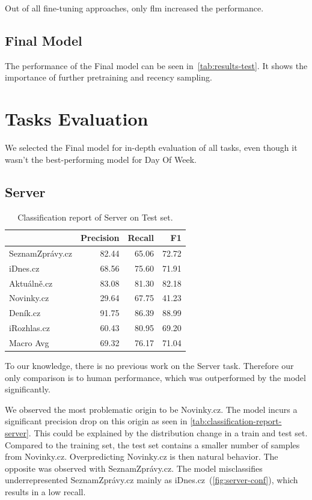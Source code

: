 Out of all fine-tuning approaches, only \ac{flm} increased the performance.

\subsection{Final Model}
\label{sec:final-model-performance-on-tasks}
The performance of the Final model can be seen in~\autoref{tab:results-test}.
It shows the importance of further pretraining and recency sampling.

\section{Tasks Evaluation}
We selected the Final model for in-depth evaluation of all tasks, even
though it wasn't the best-performing model for Day Of Week.


\subsection{Server}
\label{sec:final-model-performance-on-server}
\begin{table}[h]
    \centering\footnotesize\sf
    \begin{tabular}{lrrr}
        \toprule
        {}              & Precision & Recall & F1    \\
        \midrule
        SeznamZprávy.cz & 82.44     & 65.06  & 72.72 \\
        iDnes.cz        & 68.56     & 75.60  & 71.91 \\
        Aktuálně.cz     & 83.08     & 81.30  & 82.18 \\
        Novinky.cz      & 29.64     & 67.75  & 41.23 \\
        Deník.cz        & 91.75     & 86.39  & 88.99 \\
        iRozhlas.cz     & 60.43     & 80.95  & 69.20 \\
        Macro Avg       & 69.32     & 76.17  & 71.04 \\
        \bottomrule
    \end{tabular}
    \caption{Classification report of Server on Test set.}
    \label{tab:classification-report-server}
\end{table}
To our knowledge, there is no previous work on the Server task. Therefore our only comparison
is to human performance, which was outperformed by the model significantly.

We observed the most problematic origin to be Novinky.cz. The model
incurs a significant precision drop on this origin as seen in \autoref{tab:classification-report-server}.
This could be explained by the distribution change in a train and test set.
Compared to the training set, the test set contains a smaller number of samples from Novinky.cz.
Overpredicting Novinky.cz is then natural behavior. The opposite was observed with SeznamZprávy.cz.
The model misclassifies underrepresented SeznamZprávy.cz mainly as iDnes.cz~(\autoref{fig:server-conf}), which results in
a low recall.

